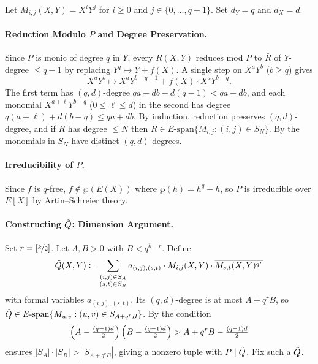 Let $M_{i,j}(X,Y)=X^iY^j$ for $i\geq 0$ and $j\in\{0,\dots,q-1\}$. Set $d_Y=q$ and $d_X=d$.

\paragraph*{Reduction Modulo $P$ and Degree Preservation.}
Since $P$ is monic of degree $q$ in $Y$, every $R(X,Y)$ reduces mod $P$ to $\bar{R}$ of $Y$-degree $\leq q-1$ by replacing $Y^q\mapsto Y+f(X)$. A single step on $X^aY^b$ ($b\geq q$) gives
$$X^aY^b\longmapsto X^aY^{b-q+1}+f(X)\cdot X^aY^{b-q}.$$
The first term has $(q,d)$-degree $qa+db-d(q-1)<qa+db$, and each monomial $X^{a+\ell}Y^{b-q}$ ($0\leq \ell\leq d$) in the second has degree $q(a+\ell)+d(b-q)\leq qa+db$. By induction, reduction preserves $(q,d)$-degree, and if $R$ has degree $\leq N$ then $\bar{R}\in E\text{-span}\{M_{i,j}: (i,j)\in S_N\}$. By \QDInjectivitylem the monomials in $S_N$ have distinct $(q,d)$-degrees.

\paragraph*{Irreducibility of $P$.}
Since $f$ is $q$-free, $f\notin\wp(E(X))$ where $\wp(h)=h^q-h$, so $P$ is irreducible over $E[X]$ by Artin--Schreier theory.

\paragraph*{Constructing $\tilde{Q}$: Dimension Argument.}
Set $r=\left[\nicefrac{k}{2}\right]$. Let $A,B>0$ with $B<q^{k-r}$. Define
$$\tilde{Q}(X,Y)\coloneqq\sum_{\substack{(i,j)\in S_A\\(s,t)\in S_B}}a_{(i,j),(s,t)}\cdot M_{i,j}(X,Y)\cdot\overline{M_{s,t}(X,Y)^{q^r}}$$
with formal variables $a_{(i,j),(s,t)}$. Its $(q,d)$-degree is at most $A+q^rB$, so $\tilde{Q}\in E\text{-span}\{M_{u,v}: (u,v)\in S_{A+q^rB}\}$. By \SNSizeQDlem the condition
\begin{equation}\label{eq:bezout-dim-cond-ext}
  \left(A-\tfrac{(q-1)d}{2}\right)\left(B-\tfrac{(q-1)d}{2}\right)>A+q^rB-\tfrac{(q-1)d}{2}
\end{equation}
ensures $|S_A|\cdot|S_B|>|S_{A+q^rB}|$, giving a nonzero tuple with $P\mid\tilde{Q}$. Fix such a $\tilde{Q}$.

